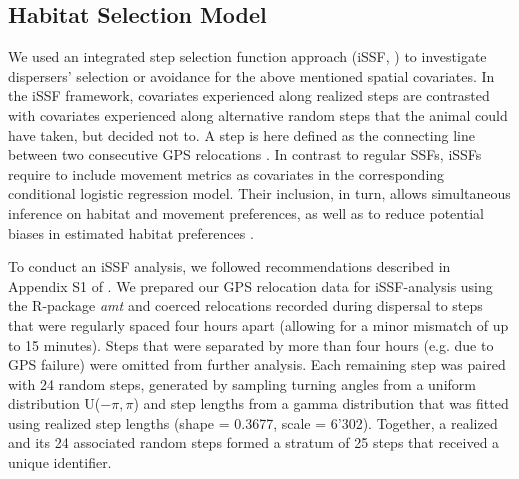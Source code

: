 \documentclass[abstract=on,10pt,a4paper,bibliography=totocnumbered]{scrartcl}
\begin{document}
\subsection{Habitat Selection Model}
\label{Modeling}
We used an integrated step selection function approach (iSSF,
\citealp{Avgar.2016}) to investigate dispersers' selection or avoidance for the
above mentioned spatial covariates. In the iSSF framework, covariates
experienced along realized steps are contrasted with covariates experienced
along alternative random steps that the animal could have taken, but decided not
to. A step is here defined as the connecting line between two consecutive GPS
relocations \citep{Turchin.1998}. In contrast to regular SSFs, iSSFs require to
include movement metrics as covariates in the corresponding conditional logistic
regression model. Their inclusion, in turn, allows simultaneous inference on
habitat and movement preferences, as well as to reduce potential biases in
estimated habitat preferences \citep{Forester.2009, Warton.2013, Avgar.2016}.

To conduct an iSSF analysis, we followed recommendations described in
Appendix S1 of \cite{Avgar.2016}. We prepared our GPS relocation data for
iSSF-analysis using the R-package \textit{amt} \citep{Amt.2019} and coerced
relocations recorded during dispersal to steps that were regularly spaced four
hours apart (allowing for a minor mismatch of up to 15 minutes). Steps that were
separated by more than four hours (e.g. due to GPS failure) were omitted from
further analysis. Each remaining step was paired with 24 random steps, generated
by sampling turning angles from a uniform distribution U(\(-\pi, \pi\)) and step
lengths from a gamma distribution that was fitted using realized step lengths
(shape = 0.3677, scale = 6'302). Together, a realized and its 24 associated
random steps formed a stratum of 25 steps that received a unique identifier.
\end{document}
